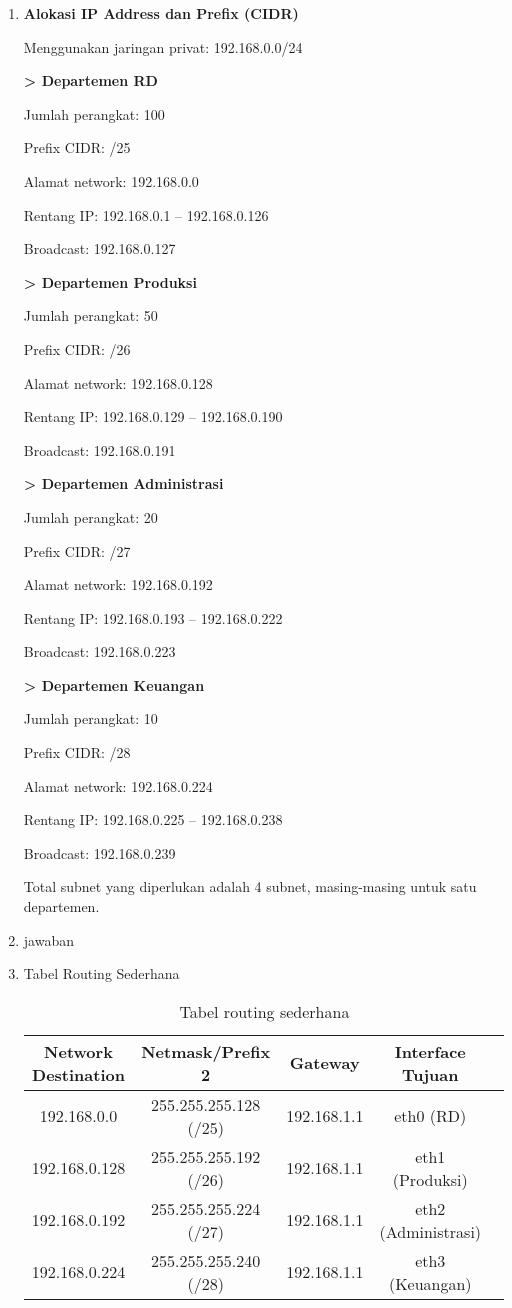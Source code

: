 \begin{enumerate}
	\item \textbf{Alokasi IP Address dan Prefix (CIDR)}
	
	Menggunakan jaringan privat: 192.168.0.0/24

	\textbf{> Departemen R\text{\&}D}

Jumlah perangkat: 100

Prefix CIDR: /25

Alamat network: 192.168.0.0

Rentang IP: 192.168.0.1 – 192.168.0.126

Broadcast: 192.168.0.127

\textbf{> Departemen Produksi}

Jumlah perangkat: 50

Prefix CIDR: /26

Alamat network: 192.168.0.128

Rentang IP: 192.168.0.129 – 192.168.0.190

Broadcast: 192.168.0.191

\textbf{> Departemen Administrasi}

Jumlah perangkat: 20

Prefix CIDR: /27

Alamat network: 192.168.0.192

Rentang IP: 192.168.0.193 – 192.168.0.222

Broadcast: 192.168.0.223

\textbf{> Departemen Keuangan}

Jumlah perangkat: 10

Prefix CIDR: /28

Alamat network: 192.168.0.224

Rentang IP: 192.168.0.225 – 192.168.0.238

Broadcast: 192.168.0.239

Total subnet yang diperlukan adalah 4 subnet, masing-masing untuk satu departemen.

\item jawaban

	\item Tabel Routing Sederhana
		\begin{table}[ht]
		\centering
		\begin{tabular}{|c|c|c|c|c|}
		\hline
		Network Destination & Netmask/Prefix 2 & Gateway & Interface Tujuan \\ \hline
		192.168.0.0 & 255.255.255.128 (/25) & 192.168.1.1 & eth0 (R\text{\&}D) \\ \hline
		192.168.0.128 & 255.255.255.192 (/26) & 192.168.1.1 & eth1 (Produksi) \\ \hline
		192.168.0.192 & 255.255.255.224 (/27) & 192.168.1.1 & eth2 (Administrasi)  \\ \hline
		192.168.0.224 & 255.255.255.240 (/28) & 192.168.1.1 & eth3 (Keuangan)  \\ \hline
		\end{tabular}
		\caption{Tabel routing sederhana}
		\end{table}
	

\end{enumerate}
